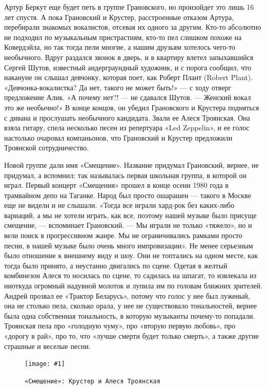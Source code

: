 \documentclass[16pt,a5paper]{book}
\newcommand{\myincludegraphics}[1]{\texttt{[image: \#1]}}
\begin{document}
Артур Беркут еще будет петь в группе Грановского, но произойдет это лишь 16 лет спустя. А пока Грановский и Крустер,
расстроенные отказом Артура, перебирали знакомых вокалистов, отсевая их одного за другим. Кто-то абсолютно не подходил
по музыкальным пристрастиям, кто-то пел слишком похоже на Ковердэйла, но так тогда пели многие, а нашим друзьям хотелось
чего-то необычного. Вдруг раздался звонок в дверь, и в квартиру влетел запыхавшийся Сергей Шутов, известный
андерграундный художник, и с порога сообщил, что накануне он слышал девчонку, которая поет, как Роберт Плант (Robert
Plant). «Девчонка-вокалистка? Да нет, такого не может быть!» — с ходу отверг предложение Алик. «А почему нет?! — не
сдавался Шутов. — Женский вокал это же необычно!» В конце концов, он убедил Грановского и Крустера подняться с дивана и
прослушать необычного кандидата. Звали ее Алеся Троянская. Она взяла гитару, спела несколько песен из репертуара «Led
Zeppelin», и ее голос настолько очаровал компаньонов, что Грановский и Крустер предложили Троянской сотрудничество.

Новой группе дали имя «Смещение». Название придумал Грановский, вернее, не придумал, а вспомнил: так называлась первая
школьная группа, в которой он играл. Первый концерт «Смещения» прошел в конце осени 1980 года в трамвайном депо на
Таганке. Народ был просто ошарашен — такого в Москве еще не видели и не слышали. «Тогда все играли хард-рок без
каких-либо вариаций, а мы не хотели играть, как все, поэтому нашей музыке было присуще смещение, — вспоминает
Грановский. — Мы играли не только «тяжело», но и вели поиск в прогрессивном жанре. Мы не ограничивались рамками просто
песни, в нашей музыке было очень много импровизации». Не менее серьезным было отношение к внешнему виду и шоу. Они не
топтались на одном месте, как тогда было принято, а неустанно двигались по сцене. Одетая в желтый комбинезон Алеся то
носилась по сцене, то садилась на шпагат, то извлекала из ниоткуда огромный надувной молоток и лупила им по головам
ближних зрителей. Андрей прозвал ее «Трактор Беларусь», потому что голос у нее был луженый, она не столько пела, сколько
орала, у нее не существовало тональностей, вернее была одна собственная тональность, в которую музыканты почему-то
попадали. Троянская пела про «голодную чуму», про «вторую первую любовь», про «дорогу в рай», про то, что «лучше смерти
будет только смерть», а также другие страшные и веселые песни.

\begin{figure}
    \centering
    \myincludegraphics{Image08}
    \caption{\texttt{«Смещение»: Крустер и Алеся Троянская}}
\end{figure}
\end{document}
